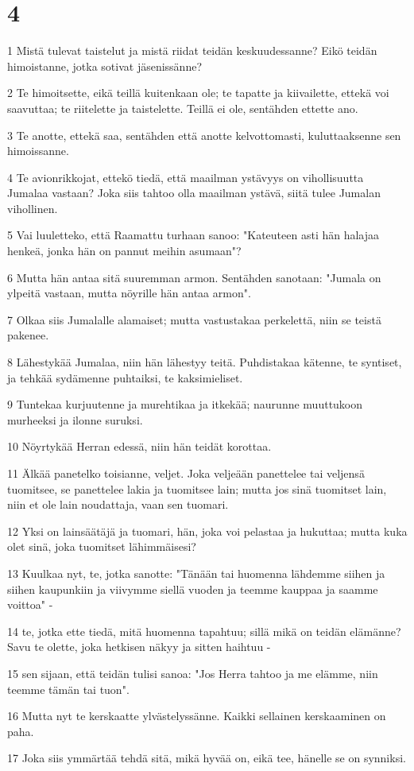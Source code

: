 \chapter{4}

\par 1 Mistä tulevat taistelut ja mistä riidat teidän keskuudessanne? Eikö teidän himoistanne, jotka sotivat jäsenissänne?
\par 2 Te himoitsette, eikä teillä kuitenkaan ole; te tapatte ja kiivailette, ettekä voi saavuttaa; te riitelette ja taistelette. Teillä ei ole, sentähden ettette ano.
\par 3 Te anotte, ettekä saa, sentähden että anotte kelvottomasti, kuluttaaksenne sen himoissanne.
\par 4 Te avionrikkojat, ettekö tiedä, että maailman ystävyys on vihollisuutta Jumalaa vastaan? Joka siis tahtoo olla maailman ystävä, siitä tulee Jumalan vihollinen.
\par 5 Vai luuletteko, että Raamattu turhaan sanoo: "Kateuteen asti hän halajaa henkeä, jonka hän on pannut meihin asumaan"?
\par 6 Mutta hän antaa sitä suuremman armon. Sentähden sanotaan: "Jumala on ylpeitä vastaan, mutta nöyrille hän antaa armon".
\par 7 Olkaa siis Jumalalle alamaiset; mutta vastustakaa perkelettä, niin se teistä pakenee.
\par 8 Lähestykää Jumalaa, niin hän lähestyy teitä. Puhdistakaa kätenne, te syntiset, ja tehkää sydämenne puhtaiksi, te kaksimieliset.
\par 9 Tuntekaa kurjuutenne ja murehtikaa ja itkekää; naurunne muuttukoon murheeksi ja ilonne suruksi.
\par 10 Nöyrtykää Herran edessä, niin hän teidät korottaa.
\par 11 Älkää panetelko toisianne, veljet. Joka veljeään panettelee tai veljensä tuomitsee, se panettelee lakia ja tuomitsee lain; mutta jos sinä tuomitset lain, niin et ole lain noudattaja, vaan sen tuomari.
\par 12 Yksi on lainsäätäjä ja tuomari, hän, joka voi pelastaa ja hukuttaa; mutta kuka olet sinä, joka tuomitset lähimmäisesi?
\par 13 Kuulkaa nyt, te, jotka sanotte: "Tänään tai huomenna lähdemme siihen ja siihen kaupunkiin ja viivymme siellä vuoden ja teemme kauppaa ja saamme voittoa" -
\par 14 te, jotka ette tiedä, mitä huomenna tapahtuu; sillä mikä on teidän elämänne? Savu te olette, joka hetkisen näkyy ja sitten haihtuu -
\par 15 sen sijaan, että teidän tulisi sanoa: "Jos Herra tahtoo ja me elämme, niin teemme tämän tai tuon".
\par 16 Mutta nyt te kerskaatte ylvästelyssänne. Kaikki sellainen kerskaaminen on paha.
\par 17 Joka siis ymmärtää tehdä sitä, mikä hyvää on, eikä tee, hänelle se on synniksi.

